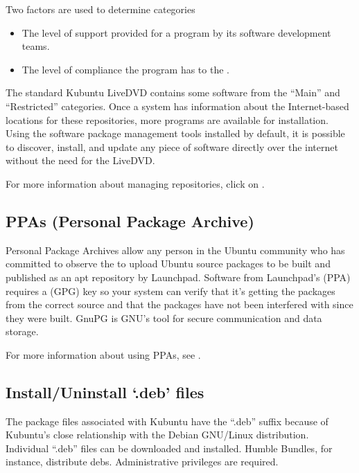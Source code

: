 \documentclass[letterpaper,10pt,english]{sphinxmanual}
\begin{document}
Two factors are used to determine categories
\begin{itemize}
\item {} 
The level of support provided for a program by its software development teams.

\item {} 
The level of compliance the program has to the .

\end{itemize}

The standard Kubuntu LiveDVD contains some software from the “Main” and “Restricted” categories. Once a system has information about the Internet-based locations for these repositories, more programs are available for installation. Using the software package management tools installed by default, it is possible to discover, install, and update any piece of software directly over the internet without the need for the LiveDVD.

For more information about managing repositories, click on {\hyperref[\detokenize{docs/repositories:repositories-link}]{}}.


\subsection{PPAs (Personal Package Archive)}
\label{\detokenize{docs/advanced:ppas-personal-package-archive}}
Personal Package Archives allow any person in the Ubuntu community who has committed to observe the  to upload Ubuntu source packages to be built and published as an apt repository by Launchpad. Software from Launchpad’s  (PPA) requires a  (GPG) key so your system can verify that it’s getting the packages from the correct source and that the packages have not been interfered with since they were built. GnuPG is GNU’s tool for secure communication and data storage.

For more information about using PPAs, see {\hyperref[\detokenize{docs/repositories:ppa-link}]{}}.


\subsection{Install/Uninstall ‘.deb’ files}
\label{\detokenize{docs/advanced:install-uninstall-deb-files}}
The package files associated with Kubuntu have the “.deb” suffix because of Kubuntu’s close relationship with the Debian GNU/Linux distribution. Individual “.deb” files can be downloaded and installed. Humble Bundles, for instance, distribute debs. Administrative privileges are required.
\end{document}
